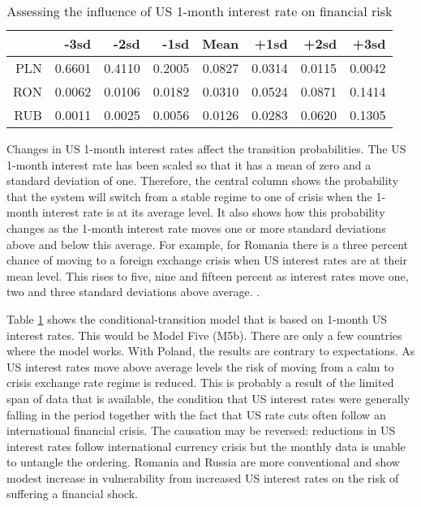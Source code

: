 \documentclass[12pt, a4paper, oneside]{article}\usepackage[]{graphicx}\usepackage[]{color}
\begin{document}
\begin{table}[t]
\begin{threeparttable}
\centering
\begin{tabular}{rrrrrrrr}
  \hline
 & -3sd & -2sd & -1sd & Mean & +1sd & +2sd & +3sd \\ 
  \hline
  PLN & 0.6601 & 0.4110 & 0.2005 & 0.0827 & 0.0314 & 0.0115 & 0.0042 \\
  RON & 0.0062 & 0.0106 & 0.0182 & 0.0310 & 0.0524 & 0.0871 & 0.1414 \\ 
  RUB & 0.0011 & 0.0025 & 0.0056 & 0.0126 & 0.0283 & 0.0620 & 0.1305 \\
   \hline
\end{tabular}
\begin{tablenotes}
\small
\item Changes in US 1-month interest rates affect the transition probabilities.  The US 1-month interest rate has been scaled so that it has a mean of zero and a standard deviation of one.  Therefore, the central column shows the probability that the system will switch from a stable regime to one of crisis when the 1-month interest rate is at its average level.  It also shows how this probability changes as the 1-month interest rate moves one or more standard deviations above and below this average. For example, for Romania there is a three percent chance of moving to a foreign exchange crisis when US interest rates are at their mean level.  This rises to five, nine and fifteen percent as interest rates move one, two and three standard deviations above average. .  
\end{tablenotes}
\caption{Assessing the influence of US 1-month interest rate on financial risk} 
\label{tabref:1mtranprob}
\end{threeparttable}
\end{table}

Table \ref{tabref:1mtranprob} shows the conditional-transition model that is based on 1-month US interest rates.  This would be Model Five (M5b). There are only a few countries where the model works.  With Poland, the results are contrary to expectations.  As US interest rates move above average levels the risk of moving from a calm to crisis exchange rate regime is reduced.  This is probably a result of the limited span of data that is available, the condition that US interest rates were generally falling in the period together with the fact that US rate cuts often follow an international financial crisis.  The causation may be reversed: reductions in US interest rates follow international currency crisis but the monthly data is unable to untangle the ordering. Romania and Russia are more conventional and show modest increase in vulnerability from increased US interest rates on the risk of suffering a financial shock.
\end{document}
